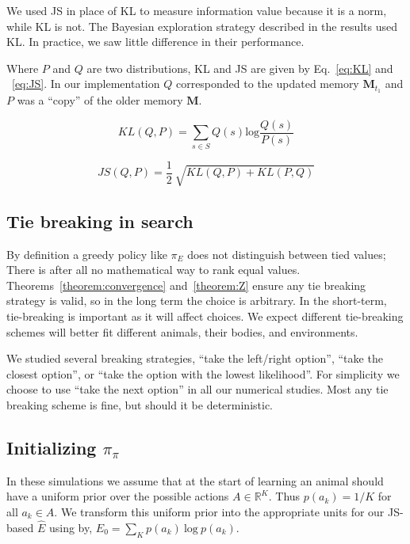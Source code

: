 We used JS in place of KL to measure information value because it is a norm, while KL is not. The Bayesian exploration strategy described in the results used KL. In practice, we saw little difference in their performance.

Where $P$ and $Q$ are two distributions, KL and JS are given by Eq.~\ref{eq:KL} and ~\ref{eq:JS}. In our implementation $Q$ corresponded to the updated memory $\mathbf{M}_{t_1}$ and $P$ was a “copy” of the older memory $\mathbf{M}$.

\begin{equation}
    \label{eq:KL}
    KL(Q, P) = \sum_{s \in S} Q(s) \text{log} \frac{Q(s)}{P(s)} 
\end{equation}

\begin{equation}
    \label{eq:JS}
    JS(Q, P) = \frac{1}{2} \ \sqrt{KL(Q, P) + KL(P, Q)}
\end{equation}

\subsection*{Tie breaking in search}
By definition a greedy policy like $\pi_E$ does not distinguish between tied values; There is after all no mathematical way to rank equal values. Theorems~\ref{theorem:convergence} and~\ref{theorem:Z} ensure any tie breaking strategy is valid, so in the long term the choice is arbitrary. In the short-term, tie-breaking is important as it will affect choices. We expect different tie-breaking schemes will better fit different animals, their bodies, and environments. 

We studied several breaking strategies, ``take the left/right option'', ``take the closest option'', or ``take the option with the lowest likelihood''. For simplicity we choose to use ``take the next option'' in all our numerical studies. Most any tie breaking scheme is fine, but should it be deterministic.

\subsection*{Initializing $\pi_\pi$}
In these simulations we assume that at the start of learning an animal should have a uniform prior over the possible actions $A \in \mathbb{R}^K$. Thus $p(a_k) = 1/K$ for all $a_k \in A$. We transform this uniform prior into the appropriate units for our JS-based $\hat E$ using by, $E_0 = \sum_K p(a_k)\ \text{log}\ p(a_k)$. 

